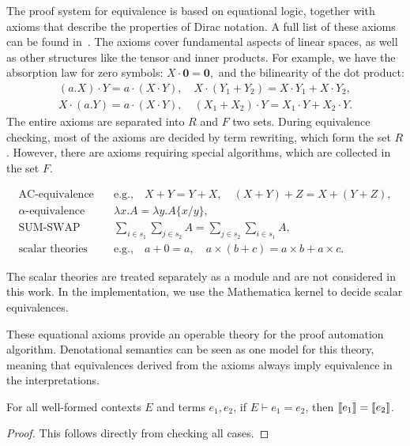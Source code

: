 The proof system for equivalence is based on equational logic, together with axioms that describe the properties of Dirac notation. A full list of these axioms can be found in~. The axioms cover fundamental aspects of linear spaces, as well as other structures like the tensor and inner products. For example, we have the absorption law for zero symbols:
\(X \cdot \mathbf{0} = \mathbf{0},\)
and the bilinearity of the dot product:
\begin{align*}
(a.X) \cdot Y = a \cdot (X \cdot Y), \quad X \cdot (Y_1 + Y_2) = X \cdot Y_1 + X \cdot Y_2, \\
X \cdot (a.Y) = a \cdot (X \cdot Y), \quad (X_1 + X_2) \cdot Y = X_1 \cdot Y + X_2 \cdot Y.
\end{align*}
The entire axioms are separated into $R$ and $F$ two sets.
During equivalence checking, most of the axioms are decided by term rewriting, which form the set $R$. However, there are axioms requiring special algorithms, which are collected in the set $F$.
\begin{definition}
\label{def: axiom F}
\begin{align*}
    \text{AC-equivalence} &\quad \text{e.g.,} \quad X + Y = Y + X, \quad (X + Y) + Z = X + (Y + Z), \\
    \alpha\text{-equivalence} &\quad \lambda x . A = \lambda y . A\{x/y\}, \\
    \text{SUM-SWAP} &\quad \sum_{i \in s_1} \sum_{j \in s_2} A = \sum_{j \in s_2} \sum_{i \in s_1} A, \\
    \text{scalar theories} &\quad \text{e.g.,} \quad a + 0 = a, \quad a \times (b + c) = a \times b + a \times c.
\end{align*}
\end{definition}

The scalar theories are treated separately as a module and are not considered in this work. In the implementation, we use the Mathematica kernel to decide scalar equivalences.

These equational axioms provide an operable theory for the proof automation algorithm. Denotational semantics can be seen as one model for this theory, meaning that equivalences derived from the axioms always imply equivalence in the interpretations.
\begin{lemma}
    For all well-formed contexts \( E \) and terms \( e_1, e_2 \), if \( E \vdash e_1 = e_2 \), then \( {\llbracket e_1 \rrbracket} = {\llbracket e_2 \rrbracket} \).
\end{lemma}
\begin{proof}
    This follows directly from checking all cases.
\end{proof}

